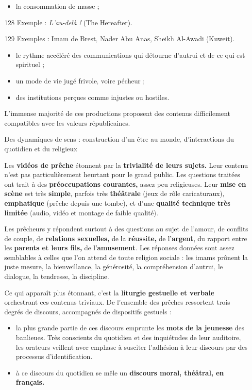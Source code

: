 \begin{itemize}
\item
  la consommation de masse ;
\end{itemize}


128 Exemple : \emph{L'au-delà !} (The Hereafter).

129 Exemples : Imam de Brest, Nader Abu Anas, Sheikh Al-Awadi (Kuweit).




\begin{itemize}
\item
  le rythme accéléré des communications qui détourne d'autrui et de ce
  qui est spirituel ;
\item
  un mode de vie jugé frivole, voire pécheur ;
\item
  des institutions perçues comme injustes ou hostiles.
\end{itemize}


L'immense majorité de ces productions proposent des contenus
difficilement compatibles avec les valeurs républicaines.


Des dynamiques de sens : construction d'un être au monde, d'interactions
du quotidien et du religieux


Les \textbf{vidéos de prêche} étonnent par la \textbf{trivialité de
leurs sujets.} Leur contenu n'est pas particulièrement heurtant pour le
grand public. Les questions traitées ont trait à des
\textbf{préoccupations courantes,} assez peu religieuses. Leur
\textbf{mise en scène} est très \textbf{simple}, parfois très
\textbf{théâtrale} (jeux de rôle caricaturaux), \textbf{emphatique}
(prêche depuis une tombe), et d'une \textbf{qualité technique très
limitée} (audio, vidéo et montage de faible qualité).

Les prêcheurs y répondent surtout à des questions au sujet de l'amour,
de conflits de couple, de \textbf{relations sexuelles,} de la
\textbf{réussite,} de l'\textbf{argent}, du rapport entre les
\textbf{parents et leurs fils,} de l'\textbf{amusement}. Les réponses
données sont assez semblables à celles que l'on attend de toute religion
sociale : les imams prônent la juste mesure, la bienveillance, la
générosité, la compréhension d'autrui, le dialogue, la tendresse, la
discipline.

Ce qui apparaît plus étonnant, c'est la \textbf{liturgie gestuelle et
verbale} orchestrant ces contenus triviaux. De l'ensemble des prêches
ressortent trois degrés de discours, accompagnés de dispositifs gestuels
:


\begin{itemize}
\item
  la plus grande partie de ces discours emprunte les \textbf{mots de la
  jeunesse} des banlieues. Très conscients du quotidien et des
  inquiétudes de leur auditoire, les orateurs veillent avec emphase à
  susciter l'adhésion à leur discours par des processus
  d'identification.
\item
  à ce discours du quotidien se mêle un \textbf{discours moral,
  théâtral, en français.}
\end{itemize}



